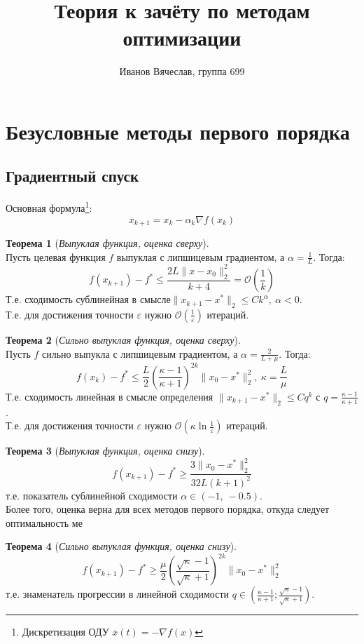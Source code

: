 \documentclass[11pt,a4paper]{report}
\title{Теория к зачёту по методам оптимизации}
\author{Иванов Вячеслав, группа 699}
\def\eps{\varepsilon}
\def\le{\leqslant}
\def\ge{\geqslant}
\theoremstyle{definition}
\theoremstyle{definition}
\newtheorem{theorem}{Теорема}[section]
\theoremstyle{definition}
\begin{document}
	\setlength{\parindent}{1cm}
	{\let\newpage\relax\maketitle}
	\tableofcontents
	\newpage
	\section{Безусловные методы первого порядка}
	\subsection{Градиентный спуск}
	Основная формула\footnote{Дискретизация ОДУ $ \stackrel{.}{x}(t) = -\nabla f(x) $}:
	$$
		x_{k+1} = x_{k} - \alpha_k \nabla f(x_k)
	$$
	\begin{theorem}[\textit{Выпуклая функция, оценка сверху}]$  $\\
		Пусть целевая функция $ f $ выпуклая с липшицевым градиентом, а $ \alpha = \frac{1}{L} $. Тогда:
		$$
			f(x_{k+1}) - f^{*} \le \frac{2L \| x - x_0 \|^2_2}{k+4} = \mathcal{O} \left (\frac{1}{k}\right )
		$$
		Т.е. сходимость сублинейная в смысле$ \| x_{k+1} - x^{*} \|_2 \le Ck^{\alpha},\ \alpha < 0 $.\\
		Т.е. для достижения точности $ \eps $ нужно $ \mathcal{O}\left( \frac{1}{\eps} \right) $ итераций.
	\end{theorem}
	\begin{theorem}[\textit{Сильно выпуклая функция, оценка сверху}]$ $\\
		Пусть $ f $ сильно выпукла с липшицевым градиентом, а $ \alpha = \frac{2}{L + \mu} $. Тогда:
		$$
			f(x_k) - f^{*} \le \frac{L}{2} \left ( \frac{\kappa - 1}{\kappa + 1} \right )^{2k} \| x_0 - x^* \|_2^2,\ \kappa = \frac{L}{\mu}
		$$
		Т.е. сходимость линейная в смысле определения $ \| x_{k+1} - x^{*} \|_2 \le Cq^{k}$ с $ q = \frac{\kappa - 1}{\kappa + 1} $.\\
		Т.е. для достижения точности $ \eps $ нужно $ \mathcal{O}\left( \kappa \ln \frac{1}{\eps} \right) $ итераций.
	\end{theorem}
	\begin{theorem}[\textit{Выпуклая функция, оценка снизу}]$  $\\
		$$
			f(x_{k+1}) - f^{*} \ge \frac{3 \| x_0 - x^* \|_2^2 }{32L(k+1)^2}
		$$
		т.е. показатель сублинейной сходимости $ \alpha \in (-1,\ -0.5) $.\\
		Более того, оценка верна для всех методов первого порядка, откуда следует оптимальность ме
	\end{theorem}
	\begin{theorem}[\textit{Сильно выпуклая функция, оценка снизу}]$  $\\
		$$
			f(x_{k+1}) - f^{*} \ge \frac{\mu}{2} \left (\frac{\sqrt{\kappa} - 1}{\sqrt{\kappa} + 1}\right )^{2k} \| x_0 - x^* \|_2^2 
		$$
		т.е. знаменатель прогрессии в линейной сходимости $ q \in \left (\frac{\kappa - 1}{\kappa + 1}; \frac{\sqrt{\kappa} - 1}{\sqrt{\kappa} + 1}\right ) $.
	\end{theorem}
\end{document}
